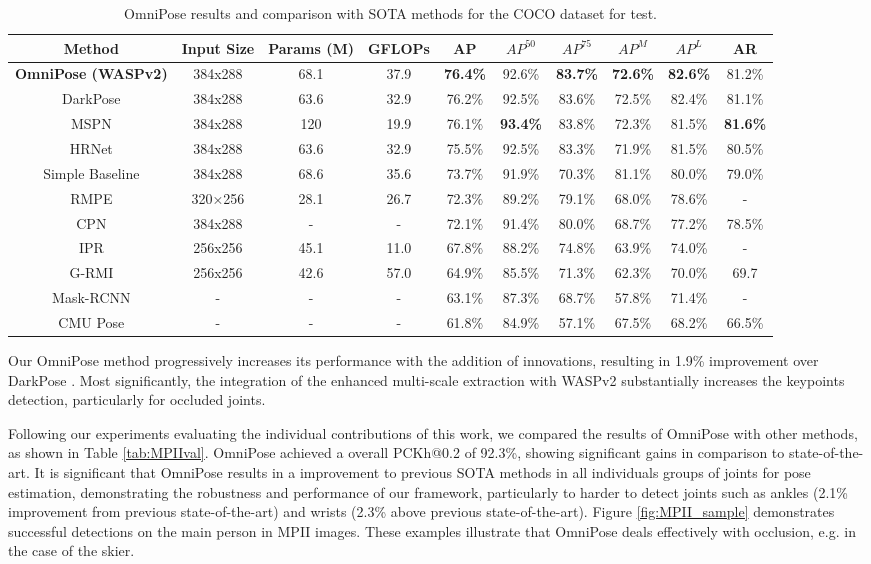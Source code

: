 \documentclass[10pt,twocolumn,letterpaper]{article}
\begin{document}
\begin{table*}[!ht]
\begin{center}
\begin{tabular}{|c|c|c|c|c|c|c|c|c|c|}
\hline
Method&Input Size&Params (M)&GFLOPs&AP&$AP^{50}$&$AP^{75}$&$AP^{M}$&$AP^{L}$&AR\\
\hline\hline
\textbf{OmniPose (WASPv2)}&384x288&
68.1&37.9&
\textbf{76.4\%}&92.6\%&
\textbf{83.7\%}&\textbf{72.6\%}&
\textbf{82.6\%}&81.2\%\\
DarkPose \cite{DarkPose}&384x288&
63.6&32.9&
76.2\%&92.5\%&
83.6\%&72.5\%&
82.4\%&81.1\%\\
MSPN \cite{MSPN}&384x288&
120&19.9&
76.1\%&\textbf{93.4\%}&
83.8\%&72.3\%&
81.5\%&\textbf{81.6\%}\\
HRNet \cite{HRNet}&384x288&
63.6&32.9&
75.5\%&92.5\%&
83.3\%&71.9\%&
81.5\%&80.5\%\\
Simple Baseline \cite{SimpleBaseline}&384x288&
68.6&35.6&
73.7\%&91.9\%&
70.3\%&81.1\%&
80.0\%&79.0\%\\
RMPE \cite{RMPE}&320×256&
28.1&26.7&
72.3\%&89.2\%&
79.1\%&68.0\%&
78.6\%&-\\
CPN \cite{CPN}&384x288&
-&-&
72.1\%&91.4\%&
80.0\%&68.7\%&
77.2\%&78.5\%\\
IPR \cite{IPR}&256x256&
45.1&11.0&
67.8\%&88.2\%&
74.8\%&63.9\%&
74.0\%&-\\
G-RMI \cite{G-RMI}&256x256&
42.6&57.0&
64.9\%&85.5\%&
71.3\%&62.3\%&
70.0\%&69.7\\
Mask-RCNN \cite{MaskRCNN}&-&
-&-&
63.1\%&87.3\%&
68.7\%&57.8\%&
71.4\%&-\\
CMU Pose \cite{OpenPose}&-&
-&-&
61.8\%&84.9\%&
57.1\%&67.5\%&
68.2\%&66.5\%\\
\hline
\end{tabular}
\end{center}
\caption{OmniPose results and comparison with SOTA methods for the COCO dataset for test.}
\label{tab:COCOtest}
\end{table*}

Our OmniPose method progressively increases its performance with the addition of innovations, resulting in 1.9\% improvement over DarkPose \cite{DarkPose}. Most significantly, the integration of the enhanced multi-scale extraction with  WASPv2 substantially increases the keypoints detection, particularly for occluded joints.

Following our experiments evaluating the individual contributions of this work, we compared the results of OmniPose with other methods, as shown in Table \ref{tab:MPIIval}.
OmniPose achieved a overall PCKh@0.2 of 92.3\%, showing significant gains in comparison to state-of-the-art. It is significant that OmniPose results in a improvement to previous SOTA methods in all individuals groups of joints for pose estimation, demonstrating the robustness and performance of our framework, particularly to harder to detect joints such as ankles (2.1\% improvement from previous state-of-the-art) and wrists (2.3\% above previous state-of-the-art).
Figure \ref{fig:MPII_sample} demonstrates successful detections on the main person in MPII images. These examples illustrate that OmniPose deals effectively with occlusion, e.g. in the case of the skier.
\end{document}
